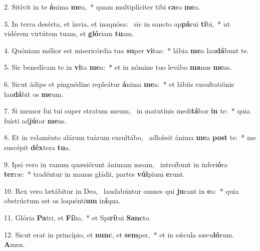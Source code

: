 2. Sitívit in te \textbf{á}nima \textbf{me}a,~*  quam multiplíciter tibi \textbf{ca}ro \textbf{me}a.\

3. In terra desérta, et ínvia, et inaquósa: \dag\  sic in sancto ap\textbf{pá}rui \textbf{ti}bi,~*  ut vidérem virtútem tuam, et \textbf{gló}riam \textbf{tu}am.\

4. Quóniam mélior est misericórdia tua \textbf{su}per \textbf{vi}tas:~*  lábia \textbf{me}a lau\textbf{dá}bunt te.\

5. Sic benedícam te in \textbf{vi}ta \textbf{me}a:~*  et in nómine tuo levábo \textbf{ma}nus \textbf{me}as.\

6. Sicut ádipe et pinguédine repleátur \textbf{á}nima \textbf{me}a:~*  et lábiis exsultatiónis lau\textbf{dá}bit os \textbf{me}um.\

7. Si memor fui tui super stratum meum, \dag\  in matutínis medi\textbf{tá}bor \textbf{in} te:~*  quia fuísti ad\textbf{jú}tor \textbf{me}us.\

8. Et in velaménto alárum tuárum exsultábo, \dag\  adhǽsit ánima \textbf{me}a \textbf{post} te:~*  me suscépit \textbf{déx}tera \textbf{tu}a.\

9. Ipsi vero in vanum quæsiérunt ánimam meam, \dag\  introíbunt in inferi\textbf{ó}ra \textbf{ter}ræ:~*  tradéntur in manus gládii, partes \textbf{vúl}pium \textbf{e}runt.\

10. Rex vero lætábitur in Deo, \dag\  laudabúntur omnes qui \textbf{ju}rant in \textbf{e}o:~*  quia obstrúctum est os loquénti\textbf{um} in\textbf{í}qua.\

11. Glória \textbf{Pa}tri, et \textbf{Fí}lio,~*  et Spi\textbf{rí}tui \textbf{Sanc}to.\

12. Sicut erat in princípio, et \textbf{nunc}, et \textbf{sem}per,~*  et in sǽcula sæcu\textbf{ló}rum. \textbf{A}men.\

